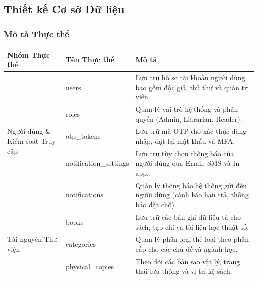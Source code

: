 \subsection{Thiết kế Cơ sở Dữ liệu}
\subsubsection{Mô tả Thực thể}

\begin{table}[H]
	\centering
	\begin{tabular}{|p{4cm}|p{4cm}|p{7cm}|}
		\hline
		\textbf{Nhóm Thực thể} & \textbf{Tên Thực thể}   & \textbf{Mô tả}                                                                   \\ \hline

		\multirow{5}{*}{Người dùng \& Kiểm soát Truy cập}
		                         & users                  & Lưu trữ hồ sơ tài khoản người dùng bao gồm độc giả, thủ thư và quản trị viên. \\ \cline{2-3}
		                         & roles                  & Quản lý vai trò hệ thống và phân quyền (Admin, Librarian, Reader).         \\ \cline{2-3}
		                         & otp\_tokens            & Lưu trữ mã OTP cho xác thực đăng nhập, đặt lại mật khẩu và MFA.                  \\ \cline{2-3}
		                         & notification\_settings & Lưu trữ tùy chọn thông báo của người dùng qua Email, SMS và In-app.           \\ \cline{2-3}
		                         & notifications          & Quản lý thông báo hệ thống gửi đến người dùng (cảnh báo hạn trả, thông báo đặt chỗ).      \\ \hline

		\multirow{5}{*}{Tài nguyên Thư viện}
		                         & books                  & Lưu trữ các bản ghi dữ liệu tả cho sách, tạp chí và tài liệu học thuật số.           \\ \cline{2-3}
		                         & categories             & Quản lý phân loại thể loại theo phân cấp cho các chủ đề và ngành học.            \\ \cline{2-3}
		                         & physical\_copies       & Theo dõi các bản sao vật lý, trạng thái lưu thông và vị trí kệ sách.             \\ \hline


\end{tabular}
\end{table}
